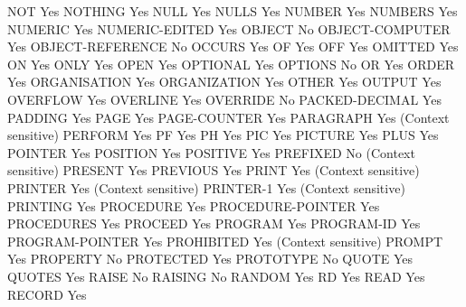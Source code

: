 NOT                             Yes
NOTHING                         Yes
NULL                            Yes
NULLS                           Yes
NUMBER                          Yes
NUMBERS                         Yes
NUMERIC                         Yes
NUMERIC-EDITED                  Yes
OBJECT                          No
OBJECT-COMPUTER                 Yes
OBJECT-REFERENCE                No
OCCURS                          Yes
OF                              Yes
OFF                             Yes
OMITTED                         Yes
ON                              Yes
ONLY                            Yes
OPEN                            Yes
OPTIONAL                        Yes
OPTIONS                         No
OR                              Yes
ORDER                           Yes
ORGANISATION                    Yes
ORGANIZATION                    Yes
OTHER                           Yes
OUTPUT                          Yes
OVERFLOW                        Yes
OVERLINE                        Yes
OVERRIDE                        No
PACKED-DECIMAL                  Yes
PADDING                         Yes
PAGE                            Yes
PAGE-COUNTER                    Yes
PARAGRAPH                       Yes (Context sensitive)
PERFORM                         Yes
PF                              Yes
PH                              Yes
PIC                             Yes
PICTURE                         Yes
PLUS                            Yes
POINTER                         Yes
POSITION                        Yes
POSITIVE                        Yes
PREFIXED                        No (Context sensitive)
PRESENT                         Yes
PREVIOUS                        Yes
PRINT                           Yes (Context sensitive)
PRINTER                         Yes (Context sensitive)
PRINTER-1                       Yes (Context sensitive)
PRINTING                        Yes
PROCEDURE                       Yes
PROCEDURE-POINTER               Yes
PROCEDURES                      Yes
PROCEED                         Yes
PROGRAM                         Yes
PROGRAM-ID                      Yes
PROGRAM-POINTER                 Yes
PROHIBITED                      Yes (Context sensitive)
PROMPT                          Yes
PROPERTY                        No
PROTECTED                       Yes
PROTOTYPE                       No
QUOTE                           Yes
QUOTES                          Yes
RAISE                           No
RAISING                         No
RANDOM                          Yes
RD                              Yes
READ                            Yes
RECORD                          Yes
